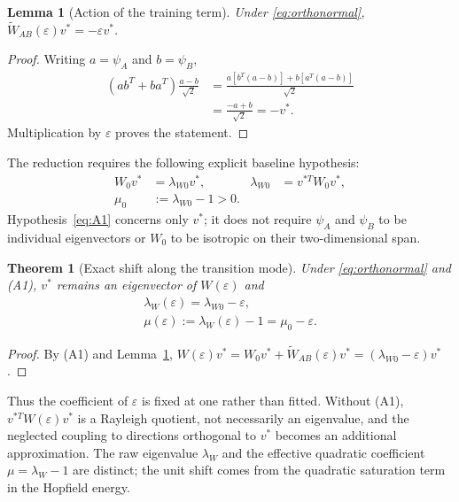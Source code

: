 \documentclass[a4paper,twocolumn,10pt]{article}
\newtheorem{theorem}{Theorem}
\newtheorem{lemma}{Lemma}
\newcommand{\eps}{\varepsilon}
\newcommand{\psiA}{\psi_A}
\newcommand{\psiB}{\psi_B}
\newcommand{\WAB}{\tilde{W}_{AB}}
\begin{document}
\begin{lemma}[Action of the training term]
\label{lem:training}
Under \eqref{eq:orthonormal}, $\WAB(\eps)v^*=-\eps v^*$.
\end{lemma}
\begin{proof}
Writing $a=\psiA$ and $b=\psiB$,
\begin{align*}
(ab^T+ba^T)\frac{a-b}{\sqrt2}
&=\frac{a[b^T(a-b)]+b[a^T(a-b)]}{\sqrt2}\\
&=\frac{-a+b}{\sqrt2}=-v^*.
\end{align*}
Multiplication by $\eps$ proves the statement.
\end{proof}

The reduction requires the following explicit baseline hypothesis:
\begin{equation}
\tag{A1}
\begin{aligned}
W_0v^*&=\lambda_{W0}v^*,& \lambda_{W0}&=v^{*T}W_0v^*,\\
\mu_0&:=\lambda_{W0}-1>0.&&
\end{aligned}
\label{eq:A1}
\end{equation}
Hypothesis~\eqref{eq:A1} concerns only $v^*$; it does not require $\psiA$ and $\psiB$ to be
individual eigenvectors or $W_0$ to be isotropic on their two-dimensional span.

\begin{theorem}[Exact shift along the transition mode]
\label{thm:shift}
Under \eqref{eq:orthonormal} and (A1), $v^*$ remains an eigenvector of $W(\eps)$ and
\begin{equation}
\begin{aligned}
\boxed{\lambda_W(\eps)=\lambda_{W0}-\eps},\\
\boxed{\mu(\eps):=\lambda_W(\eps)-1=\mu_0-\eps}.
\end{aligned}
\label{eq:eigenvalue_shift}
\end{equation}
\end{theorem}
\begin{proof}
By (A1) and Lemma~\ref{lem:training},
$W(\eps)v^*=W_0v^*+\WAB(\eps)v^*=(\lambda_{W0}-\eps)v^*$.
\end{proof}
Thus the coefficient of $\eps$ is fixed at one rather than fitted. Without (A1),
$v^{*T}W(\eps)v^*$ is a Rayleigh quotient, not necessarily an eigenvalue, and the neglected coupling
to directions orthogonal to $v^*$ becomes an additional approximation. The raw eigenvalue
$\lambda_W$ and the effective quadratic coefficient $\mu=\lambda_W-1$ are distinct; the unit shift
comes from the quadratic saturation term in the Hopfield energy.
\end{document}

